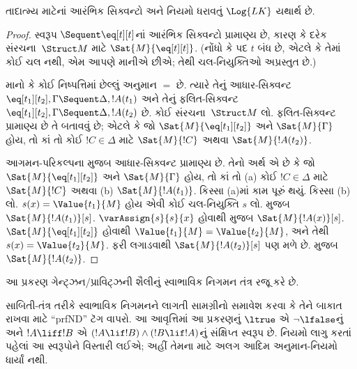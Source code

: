   \begingroup
\makeatletter{}\makeatother


\label{guunit:OLP-0083}


\begin{prop}
તાદાત્મ્ય માટેનાં આરંભિક સિક્વન્ટો અને નિયમો ધરાવતું $\Log{LK}$ યથાર્થ છે.
\end{prop}

\begin{proof}
સ્વરૂપ ${} \Sequent \eq[t][t]$નાં આરંભિક સિક્વન્ટો પ્રામાણ્ય છે, કારણ
કે દરેક સંરચના~$\Struct M$ માટે $\Sat{M}{\eq[t][t]}$. (નોંધો કે
પદ $t$ બંધ છે, એટલે કે તેમાં કોઈ ચલ નથી, એમ આપણે માનીએ છીએ; તેથી
ચલ-નિયુક્તિઓ અપ્રસ્તુત છે.)

માનો કે કોઈ નિષ્પત્તિમાં છેલ્લું અનુમાન $=$ છે. ત્યારે તેનું
આધાર-સિક્વન્ટ $\eq[t_1][t_2], \Gamma \Sequent \Delta, !A(t_1)$ અને
તેનું ફલિત-સિક્વન્ટ
$\eq[t_1][t_2], \Gamma \Sequent \Delta, !A(t_2)$ છે. કોઈ
સંરચના~$\Struct M$ લો. ફલિત-સિક્વન્ટ પ્રામાણ્ય છે તે બતાવવું છે;
એટલે કે જો $\Sat{M}{\eq[t_1][t_2]}$ અને $\Sat{M}{\Gamma}$ હોય, તો કાં
તો કોઈ $!C \in \Delta$ માટે $\Sat{M}{!C}$ અથવા $\Sat{M}{!A(t_2)}$.

આગમન-પરિકલ્પના મુજબ આધાર-સિક્વન્ટ પ્રામાણ્ય છે. તેનો અર્થ એ છે કે જો
$\Sat{M}{\eq[t_1][t_2]}$ અને $\Sat{M}{\Gamma}$ હોય, તો કાં તો
(a) કોઈ $!C \in \Delta$ માટે $\Sat{M}{!C}$ અથવા
(b) $\Sat{M}{!A(t_1)}$. કિસ્સા (a)માં કામ પૂરું થયું. કિસ્સા (b) લો.
$s(x) = \Value{t_1}{M}$ હોય એવી કોઈ ચલ-નિયુક્તિ $s$ લો.
 મુજબ
$\Sat{M}{!A(t_1)}[s]$. $\varAssign{s}{s}{x}$ હોવાથી
 મુજબ $\Sat{M}{!A(x)}[s]$.
$\Sat{M}{\eq[t_1][t_2]}$ હોવાથી
$\Value{t_1}{M} = \Value{t_2}{M}$, અને તેથી
$s(x) = \Value{t_2}{M}$.  ફરી
લગાડવાથી $\Sat{M}{!A(t_2)}[s]$ પણ મળે છે.
 મુજબ $\Sat{M}{!A(t_2)}$.
\end{proof}
\endgroup


\OLEndChapterHook
\endgroup


%
  \begingroup
\makeatletter{}\makeatother

\label{guunit:OLP-0084}

\begin{editorial}
આ પ્રકરણ ગેન્ટ્ઝન/પ્રાવિટ્ઝની શૈલીનું સ્વાભાવિક નિગમન તંત્ર રજૂ કરે છે.

સાબિતી-તંત્ર તરીકે સ્વાભાવિક નિગમનને લાગતી સામગ્રીનો સમાવેશ કરવા કે
તેને બાકાત રાખવા માટે ``prfND'' ટૅગ વાપરો.
આ આવૃત્તિમાં આ પ્રકરણનું $\ltrue$ એ $\lnot\lfalse$નું અને
$!A\liff!B$ એ $(!A\lif!B)\land(!B\lif!A)$નું સંક્ષિપ્ત સ્વરૂપ છે.
નિયમો લાગુ કરતાં પહેલાં આ સ્વરૂપોને વિસ્તારી લઈએ; અહીં તેમના માટે
અલગ આદિમ અનુમાન-નિયમો ધાર્યાં નથી.
\end{editorial}


